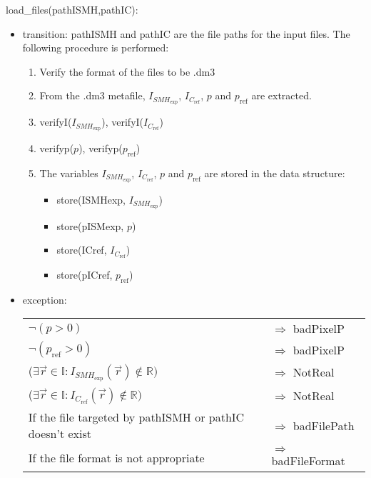 \documentclass[12pt, titlepage]{article}
\begin{document}
\noindent load{\_}files(pathISMH,pathIC):
\begin{itemize}
\item transition: pathISMH and pathIC are the file paths for the input files. 
The following procedure is performed:
\begin{enumerate}
\item Verify the format of the files to be .dm3
\item From the .dm3 metafile, $I_{\mathit{SMH}_{\text{exp}}}$, 
$I_{C_{\text{ref}}}$, $p$ and $p_{\text{ref}}$ are extracted.
\item verifyI($I_{\mathit{SMH}_{\text{exp}}}$), verifyI($I_{C_{\text{ref}}}$)
\item verifyp($p$), verifyp($p_{\text{ref}}$)
\item The variables $I_{\mathit{SMH}_{\text{exp}}}$, $I_{C_{\text{ref}}}$, $p$ 
and $p_{\text{ref}}$ are stored in the data structure:
\begin{itemize}
\item store(ISMHexp, $I_{\mathit{SMH}_{\text{exp}}}$)
\item store(pISMexp, $p$)
\item store(ICref, $I_{C_{\text{ref}}}$)
\item store(pICref, $p_{\text{ref}}$)
\end{itemize}
\end{enumerate}   
\item exception:
\noindent \begin{longtable*}[l]{l l} 
$\neg (p > 0)$ & $\Rightarrow$ badPixelP\\
$\neg (p_{\text{ref}} > 0)$ & $\Rightarrow$ badPixelP\\
($\exists \vec{r} \in \mathbb{I}:I_{\mathit{SMH}_{\text{exp}}}(\vec{r}) \notin 
\mathbb{R})$ & $\Rightarrow$ NotReal\\
($\exists \vec{r} \in \mathbb{I}:I_{C_{\text{ref}}}(\vec{r}) \notin \mathbb{R})$ 
& $\Rightarrow$ NotReal\\
If the file targeted by pathISMH or pathIC doesn't exist & $\Rightarrow$ 
badFilePath\\
If the file format is not appropriate & $\Rightarrow$ badFileFormat\\
\end{longtable*}
\end{itemize}

 
\end{document}
